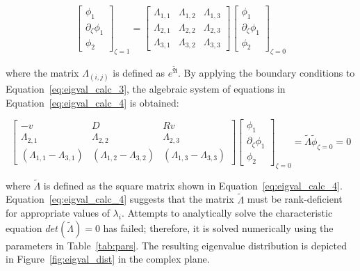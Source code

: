\begin{equation} \label{eq:eigval_calc_3}
    \begin{bmatrix}
        \phi_1 \\ \partial_\zeta \phi_1 \\ \phi_2
    \end{bmatrix}_{\zeta=1} = \begin{bmatrix}
        \Lambda_{1,1} & \Lambda_{1,2} & \Lambda_{1,3} \\
        \Lambda_{2,1} & \Lambda_{2,2} & \Lambda_{2,3} \\
        \Lambda_{3,1} & \Lambda_{3,2} & \Lambda_{3,3}
    \end{bmatrix} \begin{bmatrix}
        \phi_1 \\ \partial_\zeta \phi_1 \\ \phi_2
    \end{bmatrix}_{\zeta=0}
\end{equation}

where the matrix $\Lambda_{(i,j)}$ is defined as $e^{\tilde{\mathfrak{A}}}$. By applying the boundary conditions to Equation~\ref{eq:eigval_calc_3}, the algebraic system of equations in Equation~\ref{eq:eigval_calc_4} is obtained:

\begin{equation} \label{eq:eigval_calc_4}
    \begin{bmatrix}
        -v & D & Rv \\
        \Lambda_{2,1} & \Lambda_{2,2} & \Lambda_{2,3} \\
        (\Lambda_{1,1} - \Lambda_{3,1}) & (\Lambda_{1,2} - \Lambda_{3,2}) & (\Lambda_{1,3} - \Lambda_{3,3})
    \end{bmatrix} \begin{bmatrix}
        \phi_1 \\ \partial_\zeta \phi_1 \\ \phi_2
    \end{bmatrix}_{\zeta=0} = \tilde{\Lambda} \tilde{\phi}_{\zeta = 0} = 0
\end{equation}

where $\tilde{\Lambda}$ is defined as the square matrix shown in Equation~\ref{eq:eigval_calc_4}. Equation~\ref{eq:eigval_calc_4} suggests that the matrix $\tilde{\Lambda}$ must be rank-deficient for appropriate values of $\lambda_i$. Attempts to analytically solve the characteristic equation $det(\tilde{\Lambda}) = 0$ has failed; therefore, it is solved numerically using the parameters in Table~\ref{tab:pars}. The resulting eigenvalue distribution is depicted in Figure~\ref{fig:eigval_dist} in the complex plane.

